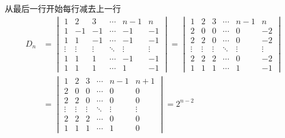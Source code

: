 \begin{solution}
    从最后一行开始每行减去上一行
    \begin{align*}
        D_n & =\begin{vmatrix}
                   1      & 2      & 3      & \cdots & n-1    & n      \\
                   1      & -1     & -1     & \cdots & -1     & -1     \\
                   1      & 1      & -1     & \cdots & -1     & -1     \\
                   \vdots & \vdots & \vdots & \ddots & \vdots & \vdots \\
                   1      & 1      & 1      & \cdots & -1     & -1     \\
                   1      & 1      & 1      & \cdots & 1      & -1
               \end{vmatrix}=\begin{vmatrix}
                                 1      & 2      & 3      & \cdots & n-1    & n      \\
                                 2      & 0      & 0      & \cdots & 0      & -2     \\
                                 2      & 2      & 0      & \cdots & 0      & -2     \\
                                 \vdots & \vdots & \vdots & \ddots & \vdots & \vdots \\
                                 2      & 2      & 2      & \cdots & 0      & -2     \\
                                 1      & 1      & 1      & \cdots & 1      & -1
                             \end{vmatrix} \\
            & =\begin{vmatrix}
                   1      & 2      & 3      & \cdots & n-1    & n+1    \\
                   2      & 0      & 0      & \cdots & 0      & 0      \\
                   2      & 2      & 0      & \cdots & 0      & 0      \\
                   \vdots & \vdots & \vdots & \ddots & \vdots & \vdots \\
                   2      & 2      & 2      & \cdots & 0      & 0      \\
                   1      & 1      & 1      & \cdots & 1      & 0
               \end{vmatrix}=2^{n-2}

\end{align*}
\end{solution}
